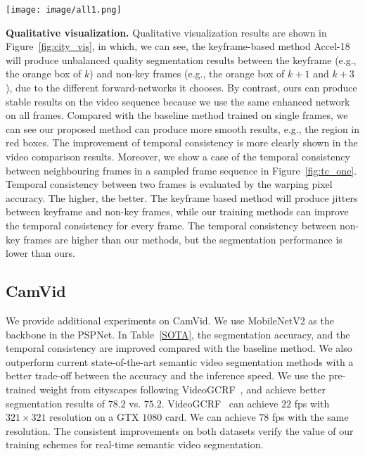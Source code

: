 \documentclass[runningheads]{llncs}
\begin{document}
\begin{figure*}[tbp]
    \centering
    \texttt{[image: image/all1.png]}
    \caption{\textbf{Qualitative outputs.}  (\textbf{a}): PSPNet18, training on multi frames and inferring on each frame. (\textbf{b}): PSPNet18, training and inferring on each frame. (\textbf{c}): Accel-18~\cite{jain2019accel}, training and inferring on multiple frames. The keyframe is selected in every five frames. For better visualization, we zoom the region in the red and orange box. The proposed method can give more consistent labels to the moving train and the trees in the red box. In the orange boxes, we can see our methods have similar quantity results in each frame while the keyframe based methods may generate worse results in the frame (e.g., $k+3$) which is far from the keyframe (i.e., $k$).}
    \label{fig:city_vis}
\end{figure*}
\noindent\textbf{Qualitative visualization.}
Qualitative visualization results are shown in Figure~\ref{fig:city_vis}, in which, we can see, the keyframe-based method Accel-18 will produce unbalanced quality segmentation results between the keyframe (e.g., the orange box of $k$) and non-key frames (e.g., the orange box of $k+1$ and $k+3$ ), due to the different forward-networks it chooses. By contrast, ours can produce stable results on the video sequence because we use the same enhanced network on all frames. Compared with the baseline method trained on single frames, we can see our proposed method can produce more smooth results, e.g., the region in red boxes. The improvement of temporal consistency is more clearly shown in the video comparison results.  Moreover, we show a case of the temporal consistency between neighbouring frames in a sampled frame sequence in Figure~\ref{fig:tc_one}. Temporal consistency between two frames is evaluated by the warping pixel accuracy. The higher, the better. The keyframe based method will produce jitters between keyframe and non-key frames, while our training methods can improve the temporal consistency for every frame. The temporal consistency between non-key frames are higher than our methods, but the segmentation performance is lower than ours.


\subsection{CamVid}
We provide additional experiments on CamVid.
We use MobileNetV2 as the backbone in the PSPNet.  In Table~\ref{SOTA}, the segmentation accuracy, and the temporal consistency are improved compared with the baseline method. We also outperform current state-of-the-art semantic video segmentation methods with a better trade-off between the accuracy and the inference speed. We use the pre-trained weight from cityscapes following VideoGCRF~\cite{chandra2018deep}, and achieve better segmentation results of $78.2$ vs. $75.2$. VideoGCRF~\cite{chandra2018deep} can achieve $22$ fps with $321\times321$ resolution on a GTX $1080$ card.
We can achieve $78$ fps with the same resolution.
The consistent improvements on both datasets
verify the value of
our training schemes for real-time semantic video segmentation.
\end{document}
